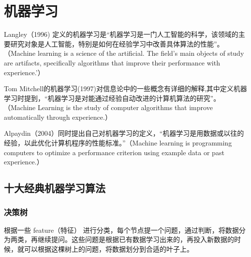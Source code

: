 





\section{机器学习}
Langley（1996) 定义的机器学习是“机器学习是一门人工智能的科学，该领域的主要研究对象是人工智能，特别是如何在经验学习中改善具体算法的性能”。（Machine learning is a science of the artificial. The field's main objects of study are artifacts, specifically algorithms that improve their performance with experience.'）

Tom Mitchell的机器学习(1997)对信息论中的一些概念有详细的解释,其中定义机器学习时提到，“机器学习是对能通过经验自动改进的计算机算法的研究”。（Machine Learning is the study of computer algorithms that improve automatically through experience.）

Alpaydin（2004）同时提出自己对机器学习的定义，“机器学习是用数据或以往的经验，以此优化计算机程序的性能标准。”（Machine learning is programming computers to optimize a performance criterion using example data or past experience.）
\subsection{十大经典机器学习算法}

\subsubsection{决策树}
根据一些 feature（特征） 进行分类，每个节点提一个问题，通过判断，将数据分为两类，再继续提问。这些问题是根据已有数据学习出来的，再投入新数据的时候，就可以根据这棵树上的问题，将数据划分到合适的叶子上。
